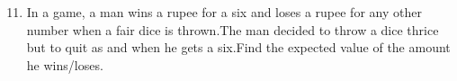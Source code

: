 \documentclass[journal,12pt,onecolumn]{article}
\begin{document}
\begin{enumerate}[label=\arabic*.]
      \setcounter{enumi}{10}
      \item In a game, a man wins a rupee for a six and loses a rupee for any other number when a fair dice is thrown.The man decided to throw a dice thrice but to quit as and when he gets a six.Find the expected value of the amount he wins/loses.
\end{enumerate}
\end{document}
